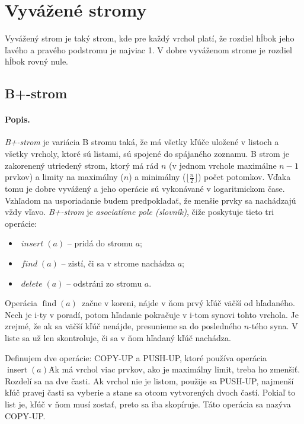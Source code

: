 \def\k{a}
\def\l{b}
\def\insert{$\mathop{insert}\left( \k \right)$}
\def\find{$\mathop{find}\left( \k \right)$}
\def\delete{$\mathop{delete}\left( \k \right)$}
\def\reverse{$\mathop{reverse}\left( \k , \l \right)$}

\section{Vyvážené stromy}

Vyvážený strom je taký strom, kde pre každý vrchol platí, že rozdiel hĺbok jeho ľavého a pravého podstromu je najviac 1. V dobre vyváženom strome je rozdiel hĺbok rovný nule.

\subsection{B+-strom}

\paragraph{Popis.}

\emph{B+-strom} je variácia B stromu taká, že má všetky kľúče uložené v listoch a všetky vrcholy, ktoré sú listami, sú spojené do spájaného zoznamu. B strom je zakorenený utriedený strom, ktorý má rád $n$ (v jednom vrchole maximálne $n-1$ prvkov) a limity na maximálny ($n$) a minimálny ($\lfloor \frac{n}{2} \rfloor$) počet potomkov. Vďaka tomu je dobre vyvážený a jeho operácie sú vykonávané v logaritmickom čase.
Vzhľadom na usporiadanie budem predpokladať, že menšie prvky sa nachádzajú vždy vľavo.
\emph{B+-strom} je \emph{asociatívne pole (slovník)}, čiže
poskytuje tieto tri operácie:
\begin{itemize}
\item $\mathop{\mathit{insert}}(\k)$ -- pridá do stromu $\k$;
\item $\mathop{\mathit{find}}(\k)$ -- zistí, či sa v strome nachádza $\k$;
\item $\mathop{\mathit{delete}}(\k)$ -- odstráni zo stromu $\k$.
\end{itemize}

Operácia \find\ začne v koreni, nájde v ňom prvý kľúč väčší od hľadaného. Nech je i-ty v poradí, potom hľadanie pokračuje v i-tom synovi tohto vrchola. Je zrejmé, že ak sa väčší kľúč nenájde, presunieme sa do posledného $n$-tého syna. V liste sa už len skontroluje, či sa v ňom hľadaný kľúč nachádza.

Definujem dve operácie: COPY-UP a PUSH-UP, ktoré používa operácia \insert\.
Ak má vrchol viac prvkov, ako je maximálny limit, treba ho zmenšiť. Rozdelí sa na dve časti. Ak vrchol nie je listom, použije sa PUSH-UP, najmenší kľúč pravej časti sa vyberie a stane sa otcom vytvorených dvoch častí. Pokiaľ to list je, kľúč v ňom musí zostať, preto sa iba skopíruje. Táto operácia sa nazýva COPY-UP.

